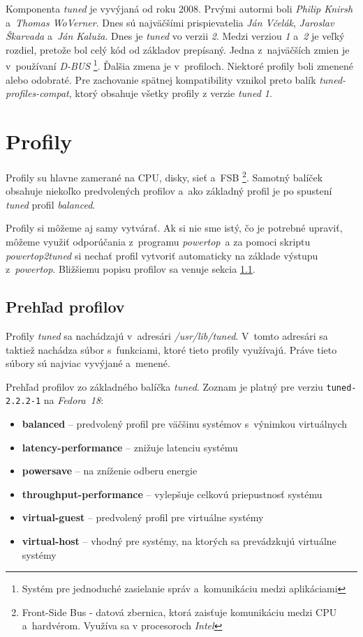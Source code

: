 Komponenta \emph{tuned} je vyvýjaná od roku 2008. Prvými autormi boli
\emph{Philip Knirsh} a~\emph{Thomas WoVerner}. Dnes sú najväčšími
prispievatelia \emph{Ján Včelák}, \emph{Jaroslav Škarvada} a~\emph{Ján Kaluža}.
Dnes je \emph{tuned} vo verzii \emph{2}. Medzi verziou \emph{1} a~\emph{2} je
veľký rozdiel, pretože bol celý kód od základov prepísaný. Jedna z~najväčších
zmien je v~používaní \emph{D-BUS} \footnote{Systém pre jednoduché zasielanie
správ a~komunikáciu medzi aplikáciami}. Ďalšia zmena je v~profiloch. Niektoré
profily boli zmenené alebo odobraté. Pre zachovanie spätnej kompatibility
vznikol preto balík \emph{tuned-profiles-compat}, ktorý obsahuje všetky profily
z verzie \emph{tuned 1}.

%
%

\section{Profily}

Profily su hlavne zamerané na CPU, disky, sieť a~FSB \footnote{Front-Side Bus -
datová zbernica, ktorá zaisťuje komunikáciu medzi CPU a~hardvérom. Využíva sa v
procesoroch \emph{Intel}}. Samotný balíček obsahuje niekoľko predvolených
profilov a~ako základný profil je po spustení \emph{tuned} profil \emph{balanced}.

Profily si môžeme aj samy vytvárať. Ak si nie sme istý, čo je potrebné upraviť,
môžeme využiť odporúčania z~programu \emph{powertop}\cite{powertopHomepage}~a
za pomoci skriptu \emph{powertop2tuned} si nechať profil vytvoriť automaticky
na základe výstupu z~\emph{powertop}. Bližšiemu popisu profilov sa venuje
sekcia \ref{sec:prehladProfilov}. 


%
%

\subsection{Prehľad profilov}
\label{sec:prehladProfilov}

Profily \emph{tuned} sa nachádzajú v~adresári \emph{/usr/lib/tuned}. V~tomto
adresári sa taktiež nachádza súbor s~funkciami, ktoré tieto profily využívajú.
Práve tieto súbory sú najviac vyvýjané a~menené.

Prehľad profilov zo základného balíčka \emph{tuned}. Zoznam je platný pre
verziu \texttt{tuned-2.2.2-1} na \emph{Fedora~18}:

\begin{itemize}
    \item \textbf{balanced} -- predvolený profil pre väčšinu systémov s~výnimkou virtuálnych
    \item \textbf{latency-performance} -- znižuje latenciu systému
    \item \textbf{powersave} -- na zníženie odberu energie
    \item \textbf{throughput-performance} -- vylepšuje celkovú priepustnosť systému 
    \item \textbf{virtual-guest} -- predvolený profil pre virtuálne systémy
    \item \textbf{virtual-host} -- vhodný pre systémy, na ktorých sa prevádzkujú virtuálne systémy
\end{itemize}

